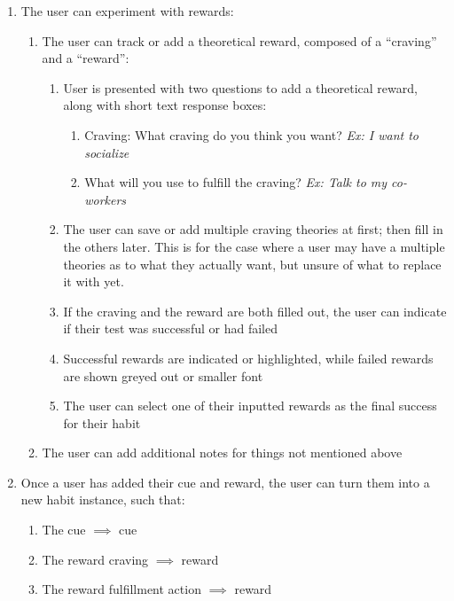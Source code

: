 \begin{enumerate}
\begin{enumerate}
            \end{enumerate}
        \item The user can experiment with rewards:
        \begin{enumerate}
            \item The user can track or add a theoretical reward, composed of a “craving” and a “reward”:
            \begin{enumerate}
                \item User is presented with two questions to add a theoretical reward, along with short text response boxes:
                \begin{enumerate}
                    \item Craving: What craving do you think you want? \textit{Ex: I want to socialize}
                    \item What will you use to fulfill the craving? \textit{Ex: Talk to my co-workers}
                \end{enumerate}
                \item The user can save or add multiple craving theories at first; then fill in the others later. This is for the case where a user may have a multiple theories as to what they actually want, but unsure of what to replace it with yet.
                \item If the craving and the reward are both filled out, the user can indicate if their test was successful or had failed
                \item Successful rewards are indicated or highlighted, while failed rewards are shown greyed out or smaller font
                \item The user can select one of their inputted rewards as the final success for their habit
            \end{enumerate}
            \item The user can add additional notes for things not mentioned above
        \end{enumerate}
        \item Once a user has added their cue and reward, the user can turn them into a new habit instance, such that:
        \begin{enumerate}
            \item The cue $\implies$ cue
            \item The reward craving $\implies$ reward
            \item The reward fulfillment action $\implies$ reward
        \end{enumerate}

\end{enumerate}
